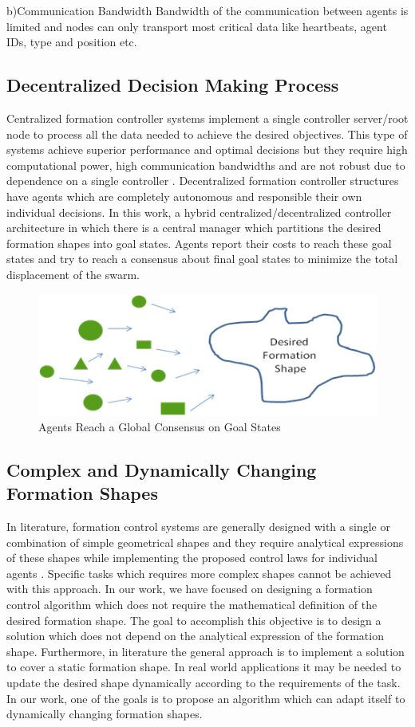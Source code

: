 b)Communication Bandwidth \newline
Bandwidth of the communication between agents is limited and nodes can only transport most critical data like heartbeats, agent IDs, type and position etc.

\subsection{ Decentralized Decision Making Process} \label{decent_decent}
Centralized formation controller systems implement a single controller  server/root node to process all the data needed to achieve the desired objectives. This type of systems achieve superior performance and optimal decisions  but they require high computational power, high communication bandwidths and are not robust due to dependence on a single controller \cite{12}. Decentralized formation controller structures have agents which are completely autonomous and responsible their own individual decisions. In this work, a hybrid centralized/decentralized controller architecture in which there is a central manager which partitions the desired formation shapes into goal states. Agents report their costs to reach these goal states and try to reach a consensus about final goal states to minimize the total displacement of the swarm.

\begin{figure}[H]
\caption{Agents Reach a Global Consensus on Goal States}
\centering
\includegraphics[scale = 0.8]{decentralized}
\end{figure} 

\subsection{Complex and Dynamically Changing Formation Shapes}
In literature, formation control systems are generally designed with a single or combination of simple geometrical shapes and they require analytical expressions of these shapes while implementing the proposed control laws for individual agents \cite{93}. Specific tasks which requires more complex shapes cannot be achieved with this approach. In our work, we have focused on designing a formation control algorithm which does not require the mathematical definition of the desired formation shape. The goal to accomplish this objective is to design a solution which does not depend on the analytical expression of the formation shape. Furthermore, in literature the general approach is to implement a solution to cover a static formation shape. In real world applications it may be needed to update the desired shape dynamically according to the requirements of the task. In our work, one of the goals is to propose an algorithm which can adapt itself to dynamically changing formation shapes.

